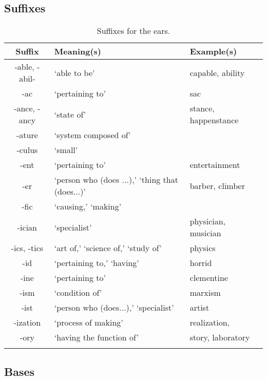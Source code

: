 \subsection{Suffixes}

\begin{longtable}{c | p{} | p{}}
    \caption{Suffixes for the ears.}
    \hline
    Suffix & Meaning(s) & Example(s) \\ \hline
        -able, -abil- & `able to be' & capable, ability \\
        -ac & `pertaining to' & sac \\
        -ance, -ancy & `state of' & stance, happenstance \\
        -ature & `system composed of' & \\
        -culus & `small' & \\
        -ent & `pertaining to' & entertainment \\
        -er & `person who (does ...),' `thing that (does...)' & barber, climber \\
        -fic & `causing,' `making' & \\
        -ician & `specialist' & physician, musician \\
        -ics, -tics & `art of,' `science of,' `study of' & physics \\
        -id & `pertaining to,' `having' & horrid \\
        -ine & `pertaining to' & clementine \\
        -ism & `condition of' & marxism \\
        -ist & `person who (does...),' `specialist' & artist \\
        -ization & `process of making' & realization, \\
        -ory & `having the function of' & story, laboratory \\
    \label{tab:Ch6Suffix}
\end{longtable}




\subsection{Bases} 

